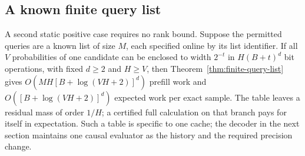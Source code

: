 \subsection{A known finite query list}

A second static positive case requires no rank bound. Suppose the
permitted queries are a known list of size $M$, each specified
online by its list identifier. If all $V$ probabilities of one
candidate can be enclosed to width $2^{-t}$ in $H(B+t)^d$ bit
operations, with fixed $d\ge2$ and $H\ge V$, then
Theorem~\ref{thm:finite-query-list} gives
$O(MH[B+\log(VH+2)]^d)$ prefill work and
$O([B+\log(VH+2)]^d)$ expected work per exact sample. The table
leaves a residual mass of order $1/H$; a certified full calculation
on that branch pays for itself in expectation. Such a table is specific
to one cache; the decoder in the next section maintains one causal
evaluator as the history and the required precision change.

